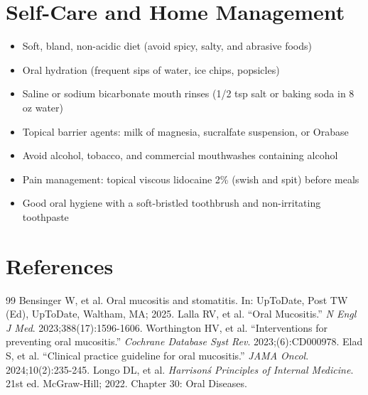 \section*{Self-Care and Home Management}
\begin{itemize}
  \item Soft, bland, non-acidic diet (avoid spicy, salty, and abrasive foods)
  \item Oral hydration (frequent sips of water, ice chips, popsicles)
  \item Saline or sodium bicarbonate mouth rinses (1/2 tsp salt or baking soda in 8 oz water)
  \item Topical barrier agents: milk of magnesia, sucralfate suspension, or Orabase
  \item Avoid alcohol, tobacco, and commercial mouthwashes containing alcohol
  \item Pain management: topical viscous lidocaine 2\% (swish and spit) before meals
  \item Good oral hygiene with a soft-bristled toothbrush and non-irritating toothpaste
\end{itemize}

\section*{References}
\begin{thebibliography}{99}
 Bensinger W, et al. Oral mucositis and stomatitis. In: UpToDate, Post TW (Ed), UpToDate, Waltham, MA; 2025.
 Lalla RV, et al. ``Oral Mucositis.'' \emph{N Engl J Med}. 2023;388(17):1596-1606.
 Worthington HV, et al. ``Interventions for preventing oral mucositis.'' \emph{Cochrane Database Syst Rev}. 2023;(6):CD000978.
 Elad S, et al. ``Clinical practice guideline for oral mucositis.'' \emph{JAMA Oncol}. 2024;10(2):235-245.
 Longo DL, et al. \emph{Harrison\'s Principles of Internal Medicine}. 21st ed. McGraw-Hill; 2022. Chapter 30: Oral Diseases.
\end{thebibliography}
